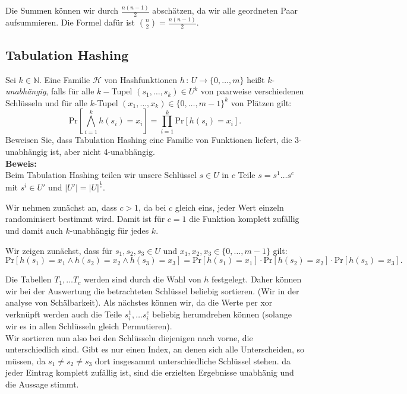 \documentclass[11pt,a4paper,ngerman]{article}
\newcommand{\prob}[1]{\text{Pr}\left[ #1 \right]}
\begin{document}
Die Summen können wir durch $\frac{n(n-1)}{2}$ abschätzen, da wir alle geordneten Paar aufsummieren.
Die Formel dafür ist $\binom{n}{2} = \frac{n(n-1)}{2}$.

\subsection*{Tabulation Hashing}
Sei $k \in \mathbb{N}$. Eine Familie $\mathcal{H}$ von Hashfunktionen $h \, : \, U \rightarrow \{ 0, \ldots, m\}$ heißt $k$-\emph{unabhängig}, falls für alle $k-$Tupel $(s_1,\ldots, s_k) \in U^k$ von paarweise verschiedenen Schlüsseln und für alle $k$-Tupel $(x_1, \ldots, x_k) \in \{0, \ldots, m-1\}^k$ von Plätzen gilt:
$$
	\prob{\bigwedge_{i=1}^k h(s_i) = x_i} = \prod_{i=1}^k \prob{h(s_i) = x_i}.
$$
Beweisen Sie, dass Tabulation Hashing eine Familie von Funktionen liefert, die 3-unabhängig ist, aber nicht 4-unabhängig.\\

\noindent\textbf{Beweis:}\\
Beim Tabulation Hashing teilen wir unsere Schlüssel $s \in U$ in $c$ Teile $s = s^1 \ldots s^c$ mit $s^i \in U'$ und $|U'| = |U|^\frac{1}{c}$.

Wir nehmen zunächst an, dass $c > 1$, da bei $c$ gleich eins, jeder Wert einzeln randominisert bestimmt wird. Damit ist für $c = 1$ die Funktion komplett zufällig und damit auch $k$-unabhängig für jedes $k$.

Wir zeigen zunächst, dass für $s_1,s_2,s_3 \in U$ und $x_1, x_2, x_3 \in \{ 0, \ldots , m-1\}$ gilt:
$$
	\prob{h(s_1) = x_1 \land h(s_2) = x_2 \land h(s_3) = x_3} = \prob{h(s_1)=x_1} \cdot \prob{h(s_2) = x_2} \cdot \prob{h(s_3) = x_3}.
$$

Die Tabellen $T_1, \ldots T_c$ werden sind durch die Wahl von $h$ festgelegt. Daher können wir bei der Auswertung die betrachteten Schlüssel beliebig sortieren. (Wir in der analyse von Schälbarkeit). Als nächstes können wir, da die Werte per xor verknüpft werden auch die Teile $s_i^1, \ldots s_i^c$ beliebig herumdrehen können (solange wir es in allen Schlüsseln gleich Permutieren).\\

Wir sortieren nun also bei den Schlüsseln diejenigen nach vorne, die unterschiedlich sind. Gibt es nur einen Index, an denen sich alle Unterscheiden,
so müssen, da $s_1 \not= s_2 \not= s_3$ dort insgesammt unterschiedliche Schlüssel stehen. da jeder Eintrag komplett zufällig ist, sind die erzielten Ergebnisse unabhänig und die Aussage stimmt.
\end{document}
